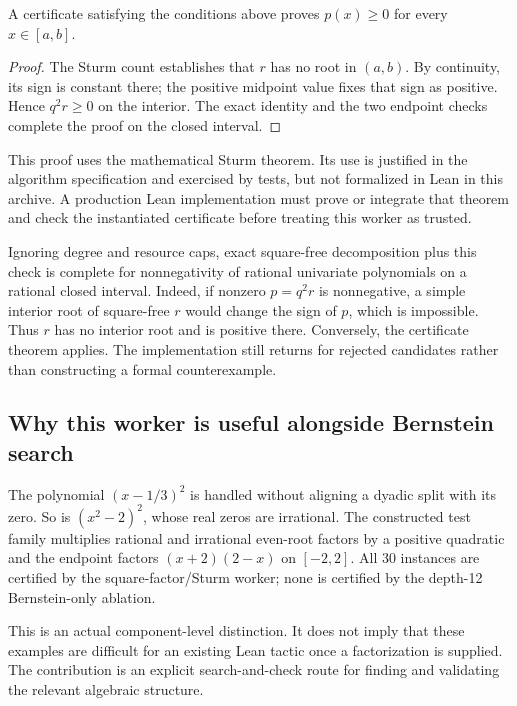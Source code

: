 \begin{theorem}
A certificate satisfying the conditions above proves $p(x)\ge0$ for every $x\in[a,b]$.
\end{theorem}
\begin{proof}
The Sturm count establishes that $r$ has no root in $(a,b)$. By continuity, its sign is constant there; the positive midpoint value fixes that sign as positive. Hence $q^2r\ge0$ on the interior. The exact identity and the two endpoint checks complete the proof on the closed interval.
\end{proof}

This proof uses the mathematical Sturm theorem. Its use is justified in the algorithm specification and exercised by tests, but not formalized in Lean in this archive. A production Lean implementation must prove or integrate that theorem and check the instantiated certificate before treating this worker as trusted.

Ignoring degree and resource caps, exact square-free decomposition plus this check is complete for nonnegativity of rational univariate polynomials on a rational closed interval. Indeed, if nonzero $p=q^2r$ is nonnegative, a simple interior root of square-free $r$ would change the sign of $p$, which is impossible. Thus $r$ has no interior root and is positive there. Conversely, the certificate theorem applies. The implementation still returns \unknown{} for rejected candidates rather than constructing a formal counterexample.

\subsection{Why this worker is useful alongside Bernstein search}

The polynomial $(x-1/3)^2$ is handled without aligning a dyadic split with its zero. So is $(x^2-2)^2$, whose real zeros are irrational. The constructed test family multiplies rational and irrational even-root factors by a positive quadratic and the endpoint factors $(x+2)(2-x)$ on $[-2,2]$. All 30 instances are certified by the square-factor/Sturm worker; none is certified by the depth-12 Bernstein-only ablation.

This is an actual component-level distinction. It does not imply that these examples are difficult for an existing Lean tactic once a factorization is supplied. The contribution is an explicit search-and-check route for finding and validating the relevant algebraic structure.

